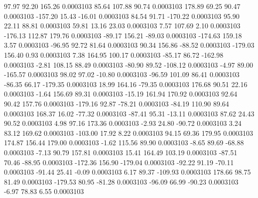        97.97       92.20      165.26     0.0003103
       85.64      107.88       90.74     0.0003103
      178.89       69.25       90.47     0.0003103
     -157.20       15.43      -16.01     0.0003103
       84.54       91.71     -170.22     0.0003103
       95.90       22.11       88.81     0.0003103
       59.81       13.16       23.03     0.0003103
        7.57      107.69        2.10     0.0003103
     -176.13      112.87      179.76     0.0003103
      -89.17      156.21      -89.03     0.0003103
     -174.63      159.18        3.57     0.0003103
      -96.95       92.72       81.64     0.0003103
       90.34      156.86      -88.52     0.0003103
     -179.03      156.40        0.93     0.0003103
        7.38      164.95      100.17     0.0003103
      -85.17       86.72     -162.98     0.0003103
       -2.81      108.15       88.49     0.0003103
      -80.90       89.52     -108.12     0.0003103
       -4.97       89.00     -165.57     0.0003103
       98.02       97.02      -10.80     0.0003103
      -96.59      101.09       86.41     0.0003103
      -86.35       66.17     -179.35     0.0003103
       18.99      164.16      -79.35     0.0003103
      176.68       90.51       22.16     0.0003103
       -1.64      156.69       89.31     0.0003103
      -15.19      161.94      170.92     0.0003103
       92.64       90.42      157.76     0.0003103
     -179.16       92.87      -78.21     0.0003103
      -84.19      110.90       89.64     0.0003103
      168.37       16.02      -77.32     0.0003103
      -87.41       95.31      -13.11     0.0003103
       87.62       24.43       90.52     0.0003103
        4.98       97.16      173.36     0.0003103
       -2.93       24.80      -90.72     0.0003103
        3.24       83.12      169.62     0.0003103
     -103.00       17.92        8.22     0.0003103
       94.15       69.36      179.95     0.0003103
      174.87      156.44      179.00     0.0003103
       -1.62      115.56       89.90     0.0003103
       -8.65       89.69      -68.88     0.0003103
       -7.13       90.79      157.81     0.0003103
       15.41      164.49      103.19     0.0003103
      -87.51       70.46      -88.95     0.0003103
     -172.36      156.90     -179.04     0.0003103
      -92.22       91.19      -70.11     0.0003103
      -91.44       25.41       -0.09     0.0003103
        6.17       89.37     -109.93     0.0003103
      178.66       98.75       81.49     0.0003103
     -179.53       80.95      -81.28     0.0003103
      -96.09       66.99      -90.23     0.0003103
       -6.97       78.83        6.55     0.0003103
